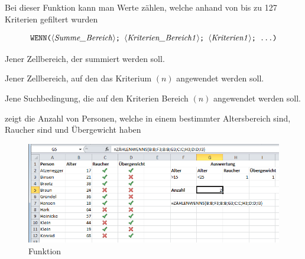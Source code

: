 Bei dieser Funktion kann man Werte zählen, welche anhand von bis zu 127 Kriterien gefiltert wurden

$$ \text{\stmt{WENN(\syntax{Summe\_Bereich}; \syntax{Kriterien\_Bereich1}; \syntax{Kriterien1}; \ldots)}}$$%
%
\begin{description}[labelindent=0cm, leftmargin=4cm, font=\mdseries, labelwidth=3cm,style=nextline]
\smallitemize
\item[\syntax{Summe\_Bereich}] Jener Zellbereich, der summiert werden soll.
\item[\syntax{Kriterien\_Bereich1}] Jener Zellbereich, auf den das Kriterium $(n)$ angewendet werden soll.
\item[\syntax{Kriterien1}] Jene Suchbedingung, die auf den Kriterien Bereich $(n)$ angewendet werden soll.
\end{description}
\pagebreak
{} zeigt die Anzahl von Personen, welche in einem bestimmter Altersbereich sind, Raucher sind und Übergewicht haben%
	\begin{figure}[H]
		\centering
			\includegraphics[scale=0.7]{images/zaehlenwenns}
		\caption{ Funktion}
		\label{fig:zaehlenwenns}
	\end{figure}


